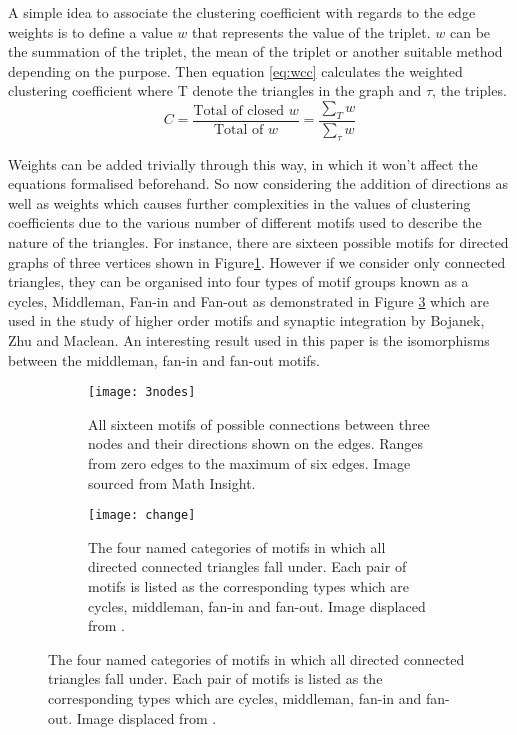 A simple idea to associate the clustering coefficient with regards to the edge weights is to define a value $w$ that represents the value of the triplet. $w$ can be the summation of the triplet, the mean of the triplet or another suitable method depending on the purpose. Then equation \ref{eq:wcc} calculates the weighted clustering coefficient\cite{opsahl2009clustering} where T denote the triangles in the graph and $\tau$, the triples.
\begin{equation} \label{eq:wcc}
C = \frac{\text{Total of closed }w}{\text{Total of }w} = \frac{\sum_T{w}}{\sum_\tau{w}}
\end{equation}

Weights can be added trivially through this way, in which it won't affect the equations formalised beforehand. So now considering the addition of directions as well as weights which causes further complexities in the values of clustering coefficients due to the various number of different motifs used to describe the nature of the triangles. For instance, there are sixteen possible motifs for directed graphs of three vertices shown in Figure\ref{fig:3nodes}. However if we consider only connected triangles, they can be organised into four types of motif groups known as a cycles, Middleman, Fan-in and Fan-out as demonstrated in Figure \ref{fig:change} which are used in the study of higher order motifs and synaptic integration by Bojanek, Zhu and Maclean\cite{synaptic}. An interesting result used in this paper is the isomorphisms between the middleman, fan-in and fan-out motifs.

\begin{figure}[!htb]
\centering
\begin{subfigure}{.45\textwidth}
	\texttt{[image: 3nodes]}
	\caption{All sixteen motifs of possible connections between three nodes and their directions shown on the edges. Ranges from zero edges to the maximum of six edges. Image sourced from Math Insight\cite{mathinsight}.}
	\label{fig:3nodes}
\end{subfigure}
\hfill
\begin{subfigure}{.45\textwidth}
	\texttt{[image: change]}
	\caption{The four named categories of motifs in which all directed connected triangles fall under. Each pair of motifs is listed as the corresponding types which are cycles, middleman, fan-in and fan-out. Image displaced from \cite{synapticimg}.}
	\label{fig:change}
\end{subfigure}
\end{figure}

